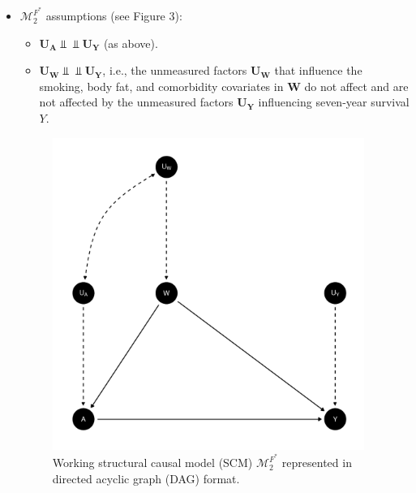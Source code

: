 \documentclass{article}\usepackage[]{graphicx}\usepackage[]{xcolor}
\newenvironment{knitrout}{}{} %
\begin{document}
\begin{enumerate}[label=\textbf{\arabic*.}]
\begin{enumerate}[label=\textbf{(\alph*)}]
\begin{itemize}
\begin{figure}
\end{figure}

\pagebreak

  \item $\mathcal{M}^{F^*}_2$ assumptions (see Figure 3): 
  
  \begin{itemize} 
  
    \item $\bm{U_A} \Perp \!\!\!\! \Perp \bm{U_Y}$ (as above).
    
    \item $\bm{U_W} \Perp \!\!\!\! \Perp \bm{U_Y}$, i.e., the unmeasured factors $\bm{U_W}$ that influence the smoking, body fat, and comorbidity covariates in $\bm{W}$ do not affect and are not affected by the unmeasured factors $\bm{U_Y}$ influencing seven-year survival $Y$.
    
  \end{itemize}
  
\begin{figure}
  \caption{Working structural causal model (SCM) $\mathcal{M}^{F^*}_2$ represented in directed acyclic graph (DAG) format.}
  \centering
  
\begin{knitrout}
\color{fgcolor}
\includegraphics[width=4in]{figure/unnamed-chunk-4-1} 

\end{knitrout}

\end{figure}

\pagebreak


\end{itemize}
\end{enumerate}
\end{enumerate}
\end{document}
